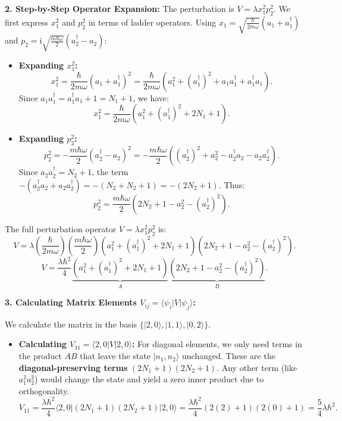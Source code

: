 \begin{solution}
\textbf{2. Step-by-Step Operator Expansion:}
The perturbation is $V = \lambda x_1^2 p_2^2$. We first express $x_1^2$ and $p_2^2$ in terms of ladder operators.
Using $x_1 = \sqrt{\frac{\hbar}{2m\omega}}(a_1 + a_1^\dagger)$ and $p_2 = \mathrm{i}\sqrt{\frac{m\hbar\omega}{2}}(a_2^\dagger - a_2)$:
\begin{itemize}
    \item \textbf{Expanding $x_1^2$:}
    \[ x_1^2 = \frac{\hbar}{2m\omega} (a_1 + a_1^\dagger)^2 = \frac{\hbar}{2m\omega} (a_1^2 + (a_1^\dagger)^2 + a_1 a_1^\dagger + a_1^\dagger a_1). \]
    Since $a_1 a_1^\dagger = a_1^\dagger a_1 + 1 = N_1 + 1$, we have:
    \[ x_1^2 = \frac{\hbar}{2m\omega} (a_1^2 + (a_1^\dagger)^2 + 2N_1 + 1). \]
    \item \textbf{Expanding $p_2^2$:}
    \[ p_2^2 = -\frac{m\hbar\omega}{2} (a_2^\dagger - a_2)^2 = -\frac{m\hbar\omega}{2} ((a_2^\dagger)^2 + a_2^2 - a_2^\dagger a_2 - a_2 a_2^\dagger). \]
    Since $a_2 a_2^\dagger = N_2 + 1$, the term $-(a_2^\dagger a_2 + a_2 a_2^\dagger) = -(N_2 + N_2 + 1) = -(2N_2 + 1)$. Thus:
    \[ p_2^2 = \frac{m\hbar\omega}{2} (2N_2 + 1 - a_2^2 - (a_2^\dagger)^2). \]
\end{itemize}
The full perturbation operator $V = \lambda x_1^2 p_2^2$ is:
\[ V = \lambda \left( \frac{\hbar}{2m\omega} \right) \left( \frac{m\hbar\omega}{2} \right) (a_1^2 + (a_1^\dagger)^2 + 2N_1 + 1) (2N_2 + 1 - a_2^2 - (a_2^\dagger)^2). \]
\[ V = \frac{\lambda\hbar^2}{4} \underbrace{(a_1^2 + (a_1^\dagger)^2 + 2N_1 + 1)}_{A} \underbrace{(2N_2 + 1 - a_2^2 - (a_2^\dagger)^2)}_{B}. \]

\textbf{3. Calculating Matrix Elements $V_{ij} = \langle \psi_i | V | \psi_j \rangle$:}

We calculate the matrix in the basis $\{|2,0\rangle, |1,1\rangle, |0,2\rangle\}$. 

\begin{itemize}
    \item \textbf{Calculating $V_{11} = \langle 2, 0 | V | 2, 0 \rangle$:}
    For diagonal elements, we only need terms in the product $AB$ that leave the state $|n_1, n_2\rangle$ unchanged. These are the \textbf{diagonal-preserving terms} $(2N_1 + 1)(2N_2 + 1)$. Any other term (like $a_1^2 a_2^2$) would change the state and yield a zero inner product due to orthogonality.
    \[ V_{11} = \frac{\lambda\hbar^2}{4} \langle 2,0 | (2N_1 + 1)(2N_2 + 1) | 2,0 \rangle = \frac{\lambda\hbar^2}{4} (2(2)+1)(2(0)+1) = \frac{5}{4}\lambda\hbar^2. \]


\end{itemize}
\end{solution}

